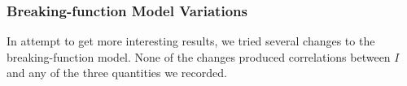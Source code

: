 \documentclass[a4paper,10pt]{article}
\begin{document}

\subsubsection{Breaking-function Model Variations}
In attempt to get more interesting results, we tried several changes to the breaking-function model. None of the changes produced correlations between $I$ and any of the three quantities we recorded.
\end{document}
